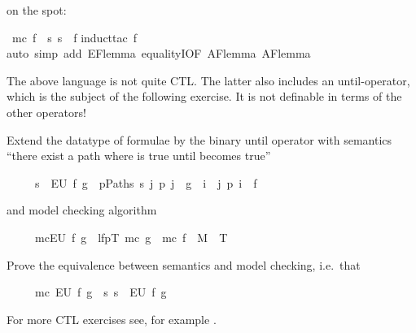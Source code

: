 \begin{isabellebody}
\begin{isamarkuptext}
on the spot:%
\end{isamarkuptext}%
\ {\isachardoublequote}mc\ f\ {\isacharequal}\ {\isacharbraceleft}s{\isachardot}\ s\ {\isasymTurnstile}\ f{\isacharbraceright}{\isachardoublequote}\isanewline
{}induct{\isacharunderscore}tac\ f{\isacharparenright}\isanewline
{}auto\ simp\ add{\isacharcolon}\ EF{\isacharunderscore}lemma\ equalityI{\isacharbrackleft}OF\ AF{\isacharunderscore}lemma\ AF{\isacharunderscore}lemma\isanewline
{}%
\begin{isamarkuptext}%
The above language is not quite CTL. The latter also includes an
until-operator, which is the subject of the following exercise.
It is not definable in terms of the other operators!
\begin{exercise}
Extend the datatype of formulae by the binary until operator  with semantics
``there exist a path where  is true until  becomes true''
\begin{isabelle}%
\ \ \ \ \ s\ {\isasymTurnstile}\ EU\ f\ g\ {\isacharequal}\ {\isacharparenleft}{\isasymexists}p{\isasymin}Paths\ s{\isachardot}\ {\isasymexists}j{\isachardot}\ p\ j\ {\isasymTurnstile}\ g\ {\isasymand}\ {\isacharparenleft}{\isasymexists}i\ {\isacharless}\ j{\isachardot}\ p\ i\ {\isasymTurnstile}\ f{\isacharparenright}{\isacharparenright}%
\end{isabelle}
and model checking algorithm
\begin{isabelle}%
\ \ \ \ \ mc{\isacharparenleft}EU\ f\ g{\isacharparenright}\ {\isacharequal}\ lfp{\isacharparenleft}{\isasymlambda}T{\isachardot}\ mc\ g\ {\isasymunion}\ mc\ f\ {\isasyminter}\ {\isacharparenleft}M{\isacharcircum}{\isacharminus}\ {\isacharcircum}{\isacharcircum}\ T{\isacharparenright}{\isacharparenright}%
\end{isabelle}
Prove the equivalence between semantics and model checking, i.e.\ that
\begin{isabelle}%
\ \ \ \ \ mc\ {\isacharparenleft}EU\ f\ g{\isacharparenright}\ {\isacharequal}\ {\isacharbraceleft}s{\isachardot}\ s\ {\isasymTurnstile}\ EU\ f\ g{\isacharbraceright}%
\end{isabelle}
\end{exercise}
For more CTL exercises see, for example \cite{Huth-Ryan-book,Clarke-as-well?}.
\bigskip


\end{isamarkuptext}
\end{isabellebody}
